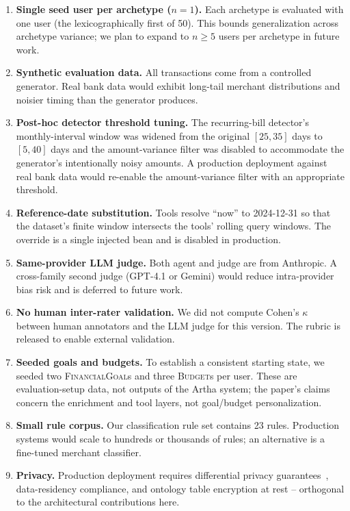 \documentclass[conference]{IEEEtran}
\begin{document}
\begin{enumerate}
  \item \textbf{Single seed user per archetype ($n=1$).} Each
    archetype is evaluated with one user (the lexicographically
    first of 50). This bounds generalization across archetype
    variance; we plan to expand to $n \geq 5$ users per archetype
    in future work.
  \item \textbf{Synthetic evaluation data.} All transactions come
    from a controlled generator. Real bank data would exhibit
    long-tail merchant distributions and noisier timing than the
    generator produces.
  \item \textbf{Post-hoc detector threshold tuning.} The
    recurring-bill detector's monthly-interval window was widened
    from the original $[25, 35]$ days to $[5, 40]$ days and the
    amount-variance filter was disabled to accommodate the
    generator's intentionally noisy amounts. A production
    deployment against real bank data would re-enable the
    amount-variance filter with an appropriate threshold.
  \item \textbf{Reference-date substitution.} Tools resolve ``now''
    to 2024-12-31 so that the dataset's finite window intersects
    the tools' rolling query windows. The override is a single
    injected bean and is disabled in production.
  \item \textbf{Same-provider LLM judge.} Both agent and judge are
    from Anthropic. A cross-family second judge (GPT-4.1 or
    Gemini) would reduce intra-provider bias risk and is deferred
    to future work.
  \item \textbf{No human inter-rater validation.} We did not
    compute Cohen's $\kappa$~\cite{cohens_kappa} between human
    annotators and the LLM judge for this version. The rubric is
    released to enable external validation.
  \item \textbf{Seeded goals and budgets.} To establish a
    consistent starting state, we seeded two
    \textsc{FinancialGoal}s and three \textsc{Budget}s per user.
    These are evaluation-setup data, not outputs of the Artha
    system; the paper's claims concern the enrichment and tool
    layers, not goal/budget personalization.
  \item \textbf{Small rule corpus.} Our classification rule set
    contains 23 rules. Production systems would scale to hundreds
    or thousands of rules; an alternative is a fine-tuned merchant
    classifier.
  \item \textbf{Privacy.} Production deployment requires
    differential privacy guarantees~\cite{dwork_dp}, data-residency
    compliance, and ontology table encryption at rest --
    orthogonal to the architectural contributions here.
\end{enumerate}
\end{document}
